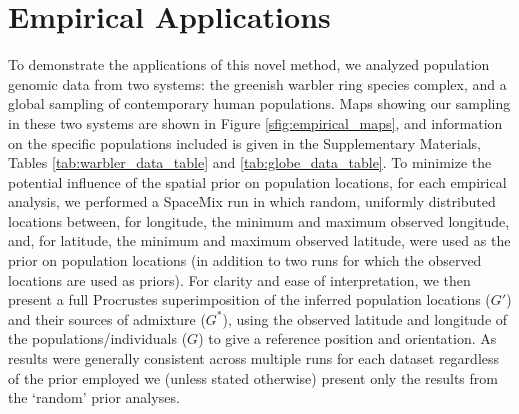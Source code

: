 \documentclass[12pt]{article}
\newcommand{\identifyadmixsource}[1]{{#1^{*}}}
\begin{document}
\section*{Empirical Applications}
To demonstrate the applications of this novel method, we analyzed population genomic data from two systems: the greenish warbler ring species complex, and a global sampling of contemporary human populations.  Maps showing our sampling in these two systems are shown in Figure \ref{sfig:empirical_maps}, and information on the specific populations included is given in the Supplementary Materials, Tables \ref{tab:warbler_data_table} and \ref{tab:globe_data_table}.  To minimize the potential influence of the spatial prior on population locations, for each empirical analysis, we performed a SpaceMix run in which random, uniformly distributed locations between, for longitude, the minimum and maximum observed longitude, and, for latitude, the minimum and maximum observed latitude, were used as the prior on population locations (in addition to two runs for which the observed locations are used as priors).  For clarity and ease of interpretation, we then present a full Procrustes superimposition of the inferred population locations ($G'$) and their sources of admixture ($\identifyadmixsource{G}$), using the observed latitude and longitude of the populations/individuals ($G$) to give a reference position and orientation.  As results were generally consistent across multiple runs for each dataset regardless of the prior employed we (unless stated otherwise) present only the results from the `random' prior analyses.
\end{document}

